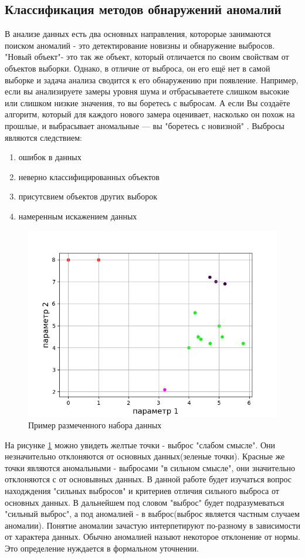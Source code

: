 \subsection{Классификация методов обнаружений аномалий}
В анализе данных есть два основных направления, которорые занимаются поиском аномалий - это детектирование новизны и обнаружение выбросов. "Новый объект"- это так же объект, который отличается по своим свойствам от объектов  выборки. Однако, в отличие от выброса, он его ещё нет в самой выборке и задача анализа сводится к его обнаружению при появление. Например, если вы анализируете замеры уровня шума и отбрасываетете слишком высокие или слишком низкие значения, то вы боретесь с выбросам. А если Вы создаёте алгоритм, который для каждого нового замера оценивает, насколько он похож на прошлые, и выбрасывает аномальные — вы "боретесь с новизной"
\cite{Book01}.
Выбросы являются следствием:
\begin{enumerate}
	\item ошибок в данных
	\item неверно классифицированных объектов
	\item присутсвием объектов других выборок
	\item намеренным искажением данных
\end{enumerate}
\begin{figure}
	\centering
	\includegraphics[width=.5\textwidth]{img/1.png}
	\caption{Пример размеченного набора данных}
	\label{fig01}
\end{figure}

На рисунке \ref{fig01} можно увидеть желтые точки - выброс "слабом смысле". Они незначительно отклоняются от основных данных(зеленые точки). Красные же точки являются аномальными - выбросами "в сильном смысле", они значительно  отклоняются с от основывных данных. В данной работе будет изучаться вопрос находждения "сильных выбросов" и  критериев отличия сильного выброса от основных данных. В дальнейшем под словом "выброс" будет подразумеваться "сильный выброс",  а под  аномалией - в выброс(выброс является частным случаем аномалии).
Понятие аномалии зачастую интерпетируют по-разному в зависимости от характера данных. Обычно аномалией назыют некоторое отклонение от нормы. Это определение нуждается в формальном уточнении.

